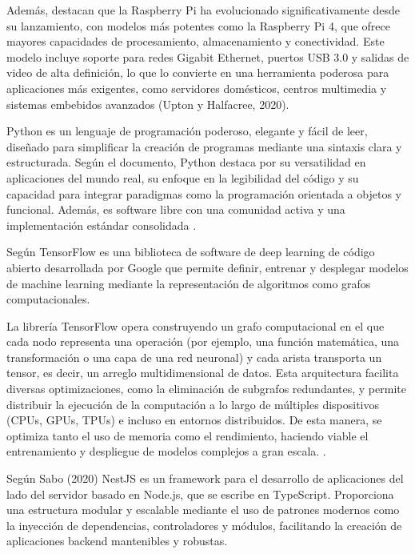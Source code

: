 Además, \citeauthor{upton_raspberry_2020} \citeyear{upton_raspberry_2020} destacan que la Raspberry Pi ha evolucionado significativamente desde su lanzamiento, con modelos más potentes como la Raspberry Pi 4, que ofrece mayores capacidades de procesamiento, almacenamiento y conectividad. Este modelo incluye soporte para redes Gigabit Ethernet, puertos USB 3.0 y salidas de video de alta definición, lo que lo convierte en una herramienta poderosa para aplicaciones más exigentes, como servidores domésticos, centros multimedia y sistemas embebidos avanzados (Upton y Halfacree, 2020).


Python es un lenguaje de programación poderoso, elegante y fácil de leer, diseñado para simplificar la creación de programas mediante una sintaxis clara y estructurada. Según el documento, Python destaca por su versatilidad en aplicaciones del mundo real, su enfoque en la legibilidad del código y su capacidad para integrar paradigmas como la programación orientada a objetos y funcional. Además, es software libre con una comunidad activa y una implementación estándar consolidada \cite{yuill_python_2006}.


Según \citeauthor{goldsborough_tour_2016} \citeyear{goldsborough_tour_2016} TensorFlow es una biblioteca de software de deep learning de código abierto desarrollada por Google que permite definir, entrenar y desplegar modelos de machine learning mediante la representación de algoritmos como grafos computacionales.

La librería TensorFlow opera construyendo un grafo computacional en el que cada nodo representa una operación (por ejemplo, una función matemática, una transformación o una capa de una red neuronal) y cada arista transporta un tensor, es decir, un arreglo multidimensional de datos. Esta arquitectura facilita diversas optimizaciones, como la eliminación de subgrafos redundantes, y permite distribuir la ejecución de la computación a lo largo de múltiples dispositivos (CPUs, GPUs, TPUs) e incluso en entornos distribuidos. De esta manera, se optimiza tanto el uso de memoria como el rendimiento, haciendo viable el entrenamiento y despliegue de modelos complejos a gran escala. \cite{goldsborough_tour_2016}.


Según \citeauthor{sabo_nestjs_2020} \citeyear{sabo_nestjs_2020} Sabo (2020) NestJS es un framework para el desarrollo de aplicaciones del lado del servidor basado en Node.js, que se escribe en TypeScript. Proporciona una estructura modular y escalable mediante el uso de patrones modernos como la inyección de dependencias, controladores y módulos, facilitando la creación de aplicaciones backend mantenibles y robustas.

